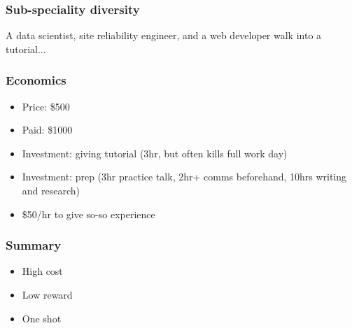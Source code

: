 \begin{frame}
\frametitle{Sub-speciality diversity}

A data scientist, site reliability engineer,
and a web developer walk into a tutorial...

\end{frame}

\begin{frame}
\frametitle{Economics}

\begin{itemize}
\item Price: \$500
\item Paid: \$1000
\item Investment: giving tutorial (3hr, but often kills full work day)
\item Investment: prep (3hr practice talk, 2hr+ comms beforehand, 10hrs writing and research)
\item \$50/hr to give so-so experience
\end{itemize}

\end{frame}

\begin{frame}
\frametitle{Summary}

\begin{itemize}

\item High cost
\item Low reward
\item One shot
\end{itemize}

\end{frame}


